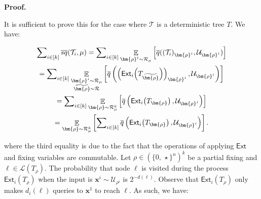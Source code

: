 



\par\medskip\noindent\textbf{Proof.}\par




It is sufficient to prove this for the case where $\mathcal{T}$ is a deterministic tree $T$. We have:\par


\[\begin{gathered}
\displaystyle\sum\nolimits_{i\in[k]}\mathop{\overline{sq}}(\mathcal{T}_{i},\mu)= \displaystyle\sum\nolimits_{i\in[k]}\mathop{\mathbb{E}}_{\bm{\rho}^{i}\sim\mathcal{R}_{\mu}}\left[\overline{q}((\mathcal{T}_{i})_{\bm{\rho}^{i}},\mathcal{U}_{\bm{\rho}^{i}})\right] \\
\displaystyle= \displaystyle\sum\nolimits_{i\in[k]}\mathop{\mathbb{E}}_{\begin{subarray}{c}\bm{\rho}^{i}\sim\mathcal{R}_{\mu}\\
\widetilde{\bm{\rho}}\sim\mathcal{R}\end{subarray}}\left[\overline{q}\left(\left(\mathsf{Ext}_{i}\mathopen{}\left(T_{\widetilde{\bm{\rho}}}\mathclose{}\right)\right)_{\bm{\rho}^{i}},\mathcal{U}_{\bm{\rho}^{i}}\right)\right] \\
\displaystyle= \displaystyle\sum\nolimits_{i\in[k]}\mathop{\mathbb{E}}_{\bm{\rho}\sim\mathcal{R}_{\mu}^{k}}\left[\overline{q}\left(\mathsf{Ext}_{i}\mathopen{}\left(T_{\bm{\rho}}\mathclose{}\right),\mathcal{U}_{\bm{\rho}^{i}}\right)\right] \\
\displaystyle= \displaystyle\mathop{\mathbb{E}}_{\bm{\rho}\sim\mathcal{R}_{\mu}^{k}}\left[\sum\nolimits_{i\in[k]}\overline{q}\left(\mathsf{Ext}_{i}\mathopen{}\left(T_{\bm{\rho}}\mathclose{}\right),\mathcal{U}_{\bm{\rho}^{i}}\right)\right].
\end{gathered}\]


where the third equality is due to the fact that the operations of applying $\mathsf{Ext}$ and fixing variables are commutable. Let $\rho\in(\{0,\,\star\}^{n})^{k}$ be a partial fixing and $\ell\in\mathcal{L}(T_{\rho})$. The probability that node $\ell$ is visited during the process $\mathsf{Ext}_{i}\mathopen{}\left(T_{\rho}\mathclose{}\right)$ when the input is $\bm{x}^{i}\sim\mathcal{U}_{\rho^{i}}$ is $2^{-d(\ell)}$. Observe that $\mathsf{Ext}_{i}\mathopen{}\left(T_{\rho}\mathclose{}\right)$ only makes $d_{i}(\ell)$ queries to $\bm{x}^{1}$ to reach $\ell$. As such, we have:\par


